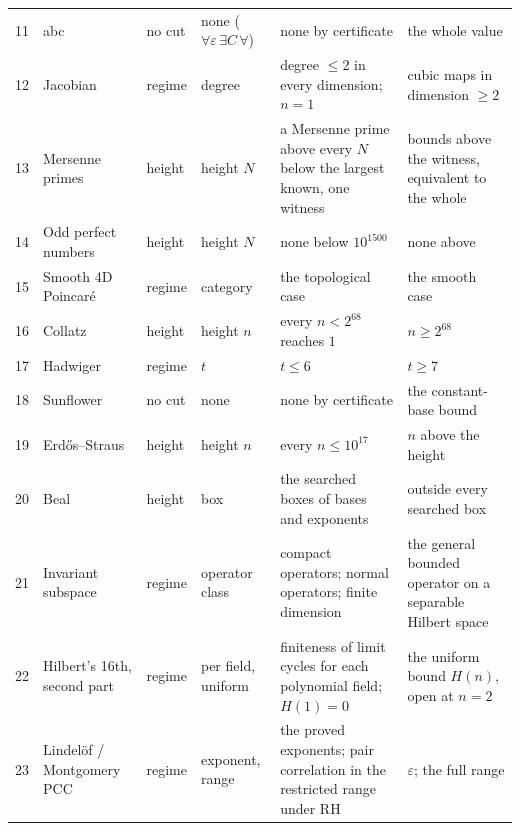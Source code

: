 \documentclass[10pt]{article}
\begin{document}
\begin{table}[!htbp]
\begin{tabularx}{\textwidth}{@{}P{0.02\textwidth} P{0.13\textwidth} P{0.05\textwidth} P{0.10\textwidth} L L@{}}
11 & abc & no cut & none ($\forall\varepsilon\,\exists C\,\forall$) & none by certificate & the whole value \\
12 & Jacobian & regime & degree & degree $\le 2$ in every dimension; $n = 1$ & cubic maps in dimension $\ge 2$ \\
13 & Mersenne primes & height & height $N$ & a Mersenne prime above every $N$ below the largest known, one witness & bounds above the witness, equivalent to the whole \\
14 & Odd perfect numbers & height & height $N$ & none below $10^{1500}$ & none above \\
15 & Smooth 4D Poincaré & regime & category & the topological case & the smooth case \\
16 & Collatz & height & height $n$ & every $n < 2^{68}$ reaches $1$ & $n \ge 2^{68}$ \\
17 & Hadwiger & regime & $t$ & $t \le 6$ & $t \ge 7$ \\
18 & Sunflower & no cut & none & none by certificate & the constant-base bound \\
19 & Erdős--Straus & height & height $n$ & every $n \le 10^{17}$ & $n$ above the height \\
20 & Beal & height & box & the searched boxes of bases and exponents & outside every searched box \\
21 & Invariant subspace & regime & operator class & compact operators; normal operators; finite dimension & the general bounded operator on a separable Hilbert space \\
22 & Hilbert's 16th, second part & regime & per field, uniform & finiteness of limit cycles for each polynomial field; $H(1) = 0$ & the uniform bound $H(n)$, open at $n = 2$ \\
23 & Lindelöf / Montgomery PCC & regime & exponent, range & the proved exponents; pair correlation in the restricted range under RH & $\varepsilon$; the full range \\
\bottomrule
\end{tabularx}
\end{table}
\end{document}
